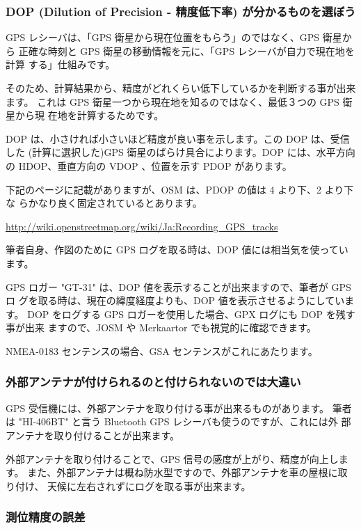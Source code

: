 \documentclass[mingoth,a4paper]{jsarticle}
\begin{document}
\subsubsection{DOP (Dilution of Precision - 精度低下率) が分かるものを選ぼう}

GPS レシーバは、「GPS 衛星から現在位置をもらう」のではなく、GPS 衛星から
正確な時刻と GPS 衛星の移動情報を元に、「GPS レシーバが自力で現在地を計算
する」仕組みです。

そのため、計算結果から、精度がどれくらい低下しているかを判断する事が出来ます。
これは GPS 衛星一つから現在地を知るのではなく、最低３つの GPS 衛星から現
在地を計算するためです。

DOP は、小さければ小さいほど精度が良い事を示します。この DOP は、受信した
(計算に選択した)GPS 衛星のばらけ具合によります。DOP には、水平方向の
HDOP、垂直方向の VDOP 、位置を示す PDOP があります。

下記のページに記載がありますが、OSM は、PDOP の値は 4 より下、2 より下な
らかなり良く固定されているとあります。

\url{http://wiki.openstreetmap.org/wiki/Ja:Recording_GPS_tracks}

筆者自身、作図のために GPS ログを取る時は、DOP 値には相当気を使っています。

GPS ロガー "GT-31" は、DOP 値を表示することが出来ますので、筆者が GPS ロ
グを取る時は、現在の緯度経度よりも、DOP 値を表示させるようにしています。
DOP をログする GPS ロガーを使用した場合、GPX ログにも DOP を残す事が出来
ますので、JOSM や Merkaartor でも視覚的に確認できます。

NMEA-0183 センテンスの場合、GSA センテンスがこれにあたります。

\subsubsection{外部アンテナが付けられるのと付けられないのでは大違い}

GPS 受信機には、外部アンテナを取り付ける事が出来るものがあります。
筆者は "HI-406BT" と言う Bluetooth GPS レシーバも使うのですが、これには外
部アンテナを取り付けることが出来ます。

外部アンテナを取り付けることで、GPS 信号の感度が上がり、精度が向上します。
また、外部アンテナは概ね防水型ですので、外部アンテナを車の屋根に取り付け、
天候に左右されずにログを取る事が出来ます。

\subsubsection{測位精度の誤差}
\end{document}
